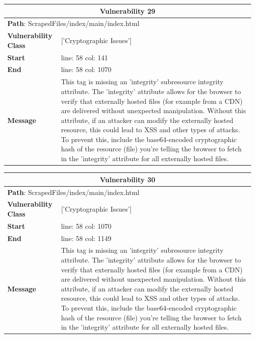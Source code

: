 \documentclass[12pt]{article}
\begin{document}
\begin{table}[!h]
\centering
\renewcommand{\arraystretch}{1.3}
\begin{tabular}{|l|p{10cm}|}
\hline
\multicolumn{2}{|c|}{\textbf{Vulnerability 29}} \\
\hline
\multicolumn{2}{|l|}{\textbf{Path}: ScrapedFiles/index/main/index.html} \\
\hline
\textbf{Vulnerability Class} & ['Cryptographic Issues'] \\
\hline
\textbf{Start} & line: 58 \quad col: 141 \\
\hline
\textbf{End} & line: 58 \quad col: 1070 \\
\hline
\textbf{Message} & This tag is missing an 'integrity' subresource integrity attribute. The 'integrity' attribute allows for the browser to verify that externally hosted files (for example from a CDN) are delivered without unexpected manipulation. Without this attribute, if an attacker can modify the externally hosted resource, this could lead to XSS and other types of attacks. To prevent this, include the base64-encoded cryptographic hash of the resource (file) you're telling the browser to fetch in the 'integrity' attribute for all externally hosted files. \\
\hline
\end{tabular}
\end{table}
\vspace{0.7cm}
\FloatBarrier
\begin{table}[!h]
\centering
\renewcommand{\arraystretch}{1.3}
\begin{tabular}{|l|p{10cm}|}
\hline
\multicolumn{2}{|c|}{\textbf{Vulnerability 30}} \\
\hline
\multicolumn{2}{|l|}{\textbf{Path}: ScrapedFiles/index/main/index.html} \\
\hline
\textbf{Vulnerability Class} & ['Cryptographic Issues'] \\
\hline
\textbf{Start} & line: 58 \quad col: 1070 \\
\hline
\textbf{End} & line: 58 \quad col: 1149 \\
\hline
\textbf{Message} & This tag is missing an 'integrity' subresource integrity attribute. The 'integrity' attribute allows for the browser to verify that externally hosted files (for example from a CDN) are delivered without unexpected manipulation. Without this attribute, if an attacker can modify the externally hosted resource, this could lead to XSS and other types of attacks. To prevent this, include the base64-encoded cryptographic hash of the resource (file) you're telling the browser to fetch in the 'integrity' attribute for all externally hosted files. \\
\hline
\end{tabular}
\end{table}
\end{document}
